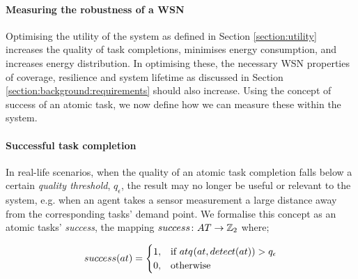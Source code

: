 \paragraph{Measuring the robustness of a WSN}

Optimising the utility of the system as defined in Section \ref{section:utility} increases the quality of task completions, minimises energy consumption, and increases energy distribution. In optimising these, the necessary WSN properties of coverage, resilience and system lifetime as discussed in Section \ref{section:background:requirements} should also increase. Using the concept of success of an atomic task, we now define how we can measure these within the system.

\newcommand{\varQualityMin}[2]{q_\epsilon}

\newcommand{\formalAtomicTaskSuccess}[2]{
	\functionFormal{success}
	{\setAtomicTask{}{}}
	{\setIntegersBinary{}{}}
}
\newcommand{\functionAtomicTaskSuccess}[2]{
	\functionSignature{success}{\varAtomicTask{}{}}
}

\newcommand{\formalCompositeTaskCoverage}[2]{
	\functionFormal{taskcov}
	{\setCompositeTask{}{}}
	{\setRealNumbersUnit{}{}}
}
\newcommand{\functionCompositeTaskCoverage}[2]{
	\functionSignature{taskcov}{\varCompositeTask{}{}}
}


\newcommand{\functionSystemCoverage}[2]{
	\functionSignature{syscov}{\setAtomicTaskInstance{}{}}
}

\paragraph{Successful task completion}
\label{section:success}
In real-life scenarios, when the quality of an atomic task completion falls below a certain \textit{quality threshold}, $\varQualityMin{}{}$, the result may no longer be useful or relevant to the system, e.g. when an agent takes a sensor measurement a large distance away from the corresponding tasks' demand point.  We formalise this concept as an atomic tasks' \textit{success}, the mapping $\formalAtomicTaskSuccess{}{}$ where;

\begin{equation}
	 \functionAtomicTaskSuccess{}{}
	 = 
	\begin{cases}
		1, & \text{if } \functionAtomicTaskQualitySensor{}{} > \varQualityMin{}{} \\
		0, & \text{otherwise}
	\end{cases}
\end{equation}


